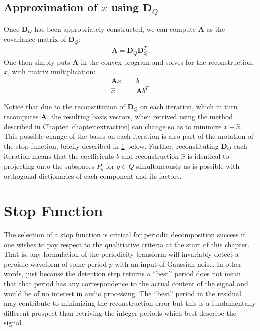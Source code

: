     \subsection{Approximation of $x$ using $\bm{D}_Q$}
    Once $\bm{D}_Q$ has been appropriately constructed, we can compute $\bm{A}$ as the covariance matrix of $\bm{D}_Q$:
    \begin{align}
        \bm{A} = \bm{D}_Q \bm{D}_Q^T
    \end{align}
    One then simply puts $\bm{A}$ in the convex program and solves for the reconstruction, $\hat{x}$, with matrix multiplication:
    \begin{align}
        \bm{A}x &= b \label{eq:detection:reconstruction:coefficients} \\
        \hat{x} &= \bm{A} b^{T} \label{eq:detection:reconstruction:xHat}
    \end{align}

    Notice that due to the reconstitution of $\bm{D}_Q$ on each iteration, which in turn recomputes $\bm{A}$, the resulting basis vectors, when retrived using the method described in Chapter \ref{chapter:extraction} can change so as to minimize $x - \hat{x}$. This possible change of the bases on each iteration is also part of the motation of the stop function, briefly described in \ref{section:detection:stopFunction} below. Further, reconstituting $\bm{D}_Q$ each iteration means that the coefficients $b$ and reconstruction $\hat{x}$ is identical to projecting onto the subspaces $P_q$ for $q \in Q$ simultaneously as is possible with orthogonal dictionaries of each component and its factors.

\section{Stop Function}\label{section:detection:stopFunction}
The selection of a stop function is critical for periodic decomposition success if one wishes to pay respect to the qualitiative criteria at the start of this chapter. That is, any formulation of the periodicity transform will invariably detect a peroidic waveform of some period $p$ with an input of Gaussian noise. In other words, just because the detection step returns a ``best'' period does not mean that that period has any correspondence to the actual content of the signal and would be of no interest in audio processing. The ``best'' period in the residual may contribute to minimizing the reconstruction error but this is a fundamentally different prospect than retriving the integer periods which best describe the signal.


